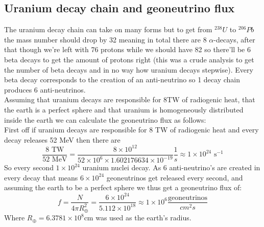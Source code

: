 \documentclass[10pt,a4paper,twoside]{article}
\begin{document}
\subsection{Uranium decay chain and geoneutrino flux}
The uranium decay chain can take on many forms but to get from $^{238}U$ to $^{206}Pb$ the mass number should drop by 32 meaning in total there are 8 $\alpha$-decays, after that though we're left with 76 protons while we should have 82 so there'll be 6 beta decays to get the amount of protons right (this was a crude analysis to get the number of beta decays and in no way how uranium decays stepwise). Every beta decay corresponds to the creation of an anti-neutrino so 1 decay chain produces 6 anti-neutrinos.\\
Assuming that uranium decays are responsible for 8TW of radiogenic heat, that the earth is a perfect sphere and that uranium is homogeneously distributed inside the earth we can calculate the geoneutrino flux as follows:\\
First off if uranium decays are responsible for 8 TW of radiogenic heat and every decay releases 52 MeV then there are 
\begin{equation}
	\frac{8\text{ TW}}{52 \text{ MeV}} = \frac{8\times10^{12}}{52\times10^{6}\times1.602176634\times10^{-19}}\frac{1}{s} \approx 1\times10^{24}\text{ s}^{-1}
\end{equation}
So every second $1\times10^{24}$ uranium nuclei decay. As 6 anti-neutrino's are created in every decay that means $6\times10^{24}$ geoneutrinos get released every second, and assuming the earth to be a perfect sphere we thus get a geoneutrino flux of:
\begin{equation}
	f = \frac{N}{4\pi R_{\oplus}^2} = \frac{6\times10^{24}}{5.112\times10^{18}} \approx 1\times10^6 \frac{\text{geoneutrinos}}{cm^2s}
\end{equation}
Where $R_{\oplus} = 6.3781\times10^8$cm was used as the earth's radius\cite{mamajek2015iau}.
\end{document}
